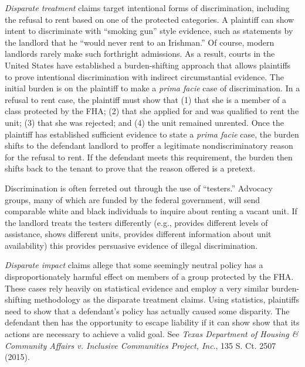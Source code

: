 
\textit{Disparate treatment} claims target intentional forms of discrimination,
including the refusal to rent based on one of the protected categories. A
plaintiff can show intent to discriminate with ``smoking gun'' style evidence,
such as statements by the landlord that he ``would never rent to an Irishman.''
Of course, modern landlords rarely make such forthright admissions.  As a
result, courts in the United States have established a burden-shifting approach
that allows plaintiffs to prove intentional discrimination with indirect
circumstantial evidence.  The initial burden is on the plaintiff to make a
\textit{prima facie} case of discrimination.  In a refusal to rent case, the
plaintiff must show that (1) that she is a member of a class protected by the
FHA; (2) that she applied for and was qualified to rent the unit; (3) that she
was rejected; and (4) the unit remained unrented.  Once the plaintiff has
established sufficient evidence to state a \textit{prima facie} case, the
burden shifts to the defendant landlord to proffer a legitimate
nondiscriminatory reason for the refusal to rent.  If the defendant meets this
requirement, the burden then shifts back to the tenant to prove that the reason
offered is a pretext.

Discrimination is often ferreted out through the use of ``testers.'' Advocacy
groups, many of which are funded by the federal government, will send
comparable white and black individuals to inquire about renting a vacant unit. 
If the landlord treats the testers differently (e.g., provides different levels
of assistance, shows different units, provides different information about unit
availability) this provides persuasive evidence of illegal discrimination.  

\textit{Disparate impact} claims allege that some seemingly neutral policy has a
disproportionately harmful effect on members of a group protected by the FHA. 
These cases rely heavily on statistical evidence and employ a very similar
burden-shifting methodology as the disparate treatment claims.  Using
statistics, plaintiffs need to show that a defendant's policy has actually
caused some disparity.  The defendant then has the opportunity to escape
liability if it can show show that its actions are necessary to achieve a valid
goal. See \textit{Texas Department of Housing \& Community Affairs v. Inclusive
Communities Project, Inc}., 135 S. Ct. 2507 (2015).

